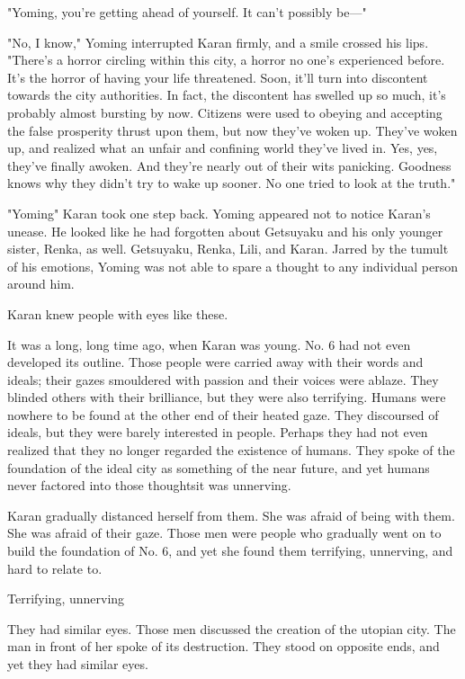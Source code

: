 "Yoming, you're getting ahead of yourself. It can't possibly be---"

"No, I know," Yoming interrupted Karan firmly, and a smile crossed his
lips. "There's a horror circling within this city, a horror no one's
experienced before. It's the horror of having your life threatened.
Soon, it'll turn into discontent towards the city authorities. In fact,
the discontent has swelled up so much, it's probably almost bursting by
now. Citizens were used to obeying and accepting the false prosperity
thrust upon them, but now they've woken up. They've woken up, and
realized what an unfair and confining world they've lived in. Yes, yes,
they've finally awoken. And they're nearly out of their wits panicking.
Goodness knows why they didn't try to wake up sooner. No one tried to
look at the truth."

"Yoming\el " Karan took one step back. Yoming appeared not to notice
Karan's unease. He looked like he had forgotten about Getsuyaku and his
only younger sister, Renka, as well. Getsuyaku, Renka, Lili, and Karan.
Jarred by the tumult of his emotions, Yoming was not able to spare a
thought to any individual person around him.

Karan knew people with eyes like these.

It was a long, long time ago, when Karan was young. No. 6 had not even
developed its outline. Those people were carried away with their words
and ideals; their gazes smouldered with passion and their voices were
ablaze. They blinded others with their brilliance, but they were also
terrifying. Humans were nowhere to be found at the other end of their
heated gaze. They discoursed of ideals, but they were barely interested
in people. Perhaps they had not even realized that they no longer
regarded the existence of humans. They spoke of the foundation of the
ideal city as something of the near future, and yet humans never
factored into those thoughts\el it was unnerving.

Karan gradually distanced herself from them. She was afraid of being
with them. She was afraid of their gaze. Those men were people who
gradually went on to build the foundation of No. 6, and yet she found
them terrifying, unnerving, and hard to relate to.

Terrifying, unnerving\el 

They had similar eyes. Those men discussed the creation of the utopian
city. The man in front of her spoke of its destruction. They stood on
opposite ends, and yet they had similar eyes.

